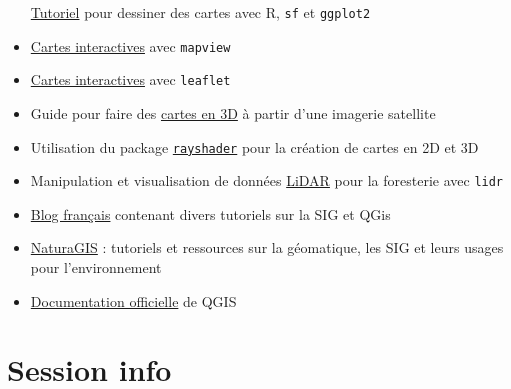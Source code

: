 \documentclass[
  french,
]{book}
\begin{document}
\begin{itemize}
  \href{https://www.r-spatial.org/r/2018/10/25/ggplot2-sf.html}{Tutoriel}
  pour dessiner des cartes avec R, \texttt{sf} et \texttt{ggplot2}
\item
  \href{https://r-spatial.github.io/mapview/}{Cartes interactives} avec \texttt{mapview}
\item
  \href{https://rstudio.github.io/leaflet/}{Cartes interactives} avec \texttt{leaflet}
\item
  Guide pour faire des
  \href{https://www.tylermw.com/a-step-by-step-guide-to-making-3d-maps-with-satellite-imagery-in-r/}{cartes en 3D}
  à partir d'une imagerie satellite
\item
  Utilisation du package \href{https://www.rayshader.com/}{\texttt{rayshader}} pour la
  création de cartes en 2D et 3D
\item
  Manipulation et visualisation de données
  \href{https://github.com/Jean-Romain/lidR}{LiDAR} pour la foresterie avec \texttt{lidr}
\item
  \href{https://www.sigterritoires.fr/index.php/concepts/}{Blog français} contenant
  divers tutoriels sur la SIG et QGis
\item
  \href{https://naturagis.fr/}{NaturaGIS} : tutoriels et ressources sur la géomatique, les SIG et leurs usages pour l'environnement
\item
  \href{https://docs.qgis.org/3.10/fr/docs/}{Documentation officielle} de QGIS
\end{itemize}

\hypertarget{session-info}{%
\chapter*{Session info}\label{session-info}}
\end{document}
